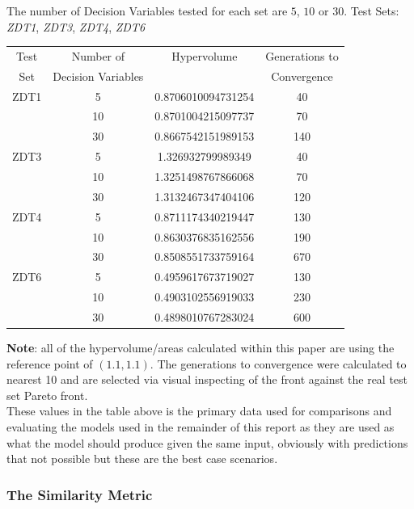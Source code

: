 \documentclass[sigconf,review,nonacm]{acmart}
\begin{document}
The number of Decision Variables tested for each set are $5$, $10$ or $30$. 
Test Sets: \textit{ZDT1}, \textit{ZDT3}, \textit{ZDT4}, \textit{ZDT6}

\vspace{0.5em}

\begin{center}
\begin{tabular}{c|c|c|c}
    Test & Number of & Hypervolume & Generations to \\
    Set & Decision Variables &   & Convergence \\ \hline
    ZDT1  &     5   & 0.8706010094731254 & 40 \\ 
          &     10  & 0.8701004215097737 & 70 \\
          &     30  & 0.8667542151989153 & 140 \\ \hline
    ZDT3  &     5   & 1.326932799989349 & 40 \\ 
          &     10  & 1.3251498767866068 & 70 \\
          &     30  & 1.3132467347404106 & 120\\ \hline
    ZDT4  &     5   & 0.8711174340219447 & 130 \\ 
          &     10  & 0.8630376835162556 & 190 \\
          &     30  & 0.8508551733759164 & 670 \\ \hline
    ZDT6  &     5   & 0.4959617673719027 & 130 \\ 
          &     10  & 0.4903102556919033 & 230 \\
          &     30  & 0.4898010767283024 & 600 \\ 
\end{tabular}
\end{center}

\textbf{Note}: all of the hypervolume/areas calculated within this paper are using the reference point of $(1.1, 1.1)$. The generations to convergence were calculated to nearest 10 and are selected via visual inspecting of the front against the real test set Pareto front. \\

\noindent These values in the table above is the primary data used for comparisons and evaluating the models used in the remainder of this report as they are used as what the model should produce given the same input, obviously with predictions that not possible but these are the best case scenarios. 

\subsubsection{The Similarity Metric}  
\end{document}
